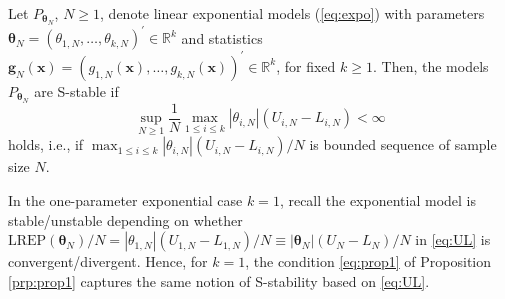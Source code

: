 \documentclass[numbib]{imamat}
\theoremstyle{theorem}
\theoremstyle{lemma}
\theoremstyle{example}
\theoremstyle{corollary}
\theoremstyle{definition}
\theoremstyle{remark}
\theoremstyle{approximation}
\theoremstyle{scheme}
\newcommand{\REP}{\mathrm{LREP}}
\let\BeginKnitrBlock\begin \let\EndKnitrBlock\end
\begin{document}
\BeginKnitrBlock{proposition}
\protect\hypertarget{prp:prop1}{}{\label{prp:prop1} }Let \(P_{\boldsymbol \theta_N}\), \(N \geq 1\), denote linear exponential models (\ref{eq:expo}) with parameters \(\boldsymbol \theta_N = (\theta_{1,N},\ldots,\theta_{k,N})^\prime \in \mathbb{R}^k\) and statistics \(\boldsymbol g_N(\boldsymbol x) = (g_{1,N}(\boldsymbol x),\ldots, g_{k,N}(\boldsymbol x))^\prime \in \mathbb{R}^k\), for fixed \(k \geq 1\). Then, the models \(P_{\boldsymbol \theta_N}\) are S-stable if
\begin{equation}
\label{eq:prop1}
\sup_{N \geq 1}\frac{1}{N} \max_{1 \leq i \leq k }|\theta_{i,N}|(U_{i,N}-L_{i,N})<\infty
\end{equation}
holds, i.e., if \(\max_{1 \leq i \leq k } |\theta_{i,N}|(U_{i,N}-L_{i,N})/N\) is bounded sequence of sample size \(N\).
\EndKnitrBlock{proposition}

\BeginKnitrBlock{remark}
\iffalse{} {Remark. } \fi{}In the one-parameter exponential case \(k=1\), recall the exponential model is stable/unstable depending on whether \(\REP(\boldsymbol \theta_N)/N = |\theta_{1,N}|(U_{1,N}-L_{1,N})/N \equiv |\boldsymbol \theta_{N}|(U_{N}-L_{N})/N\) in \eqref{eq:UL} is convergent/divergent. Hence, for \(k=1\), the condition \eqref{eq:prop1} of Proposition \ref{prp:prop1} captures the same notion of S-stability based on \eqref{eq:UL}.
\EndKnitrBlock{remark}
\end{document}
